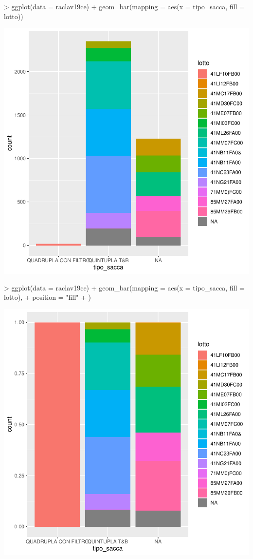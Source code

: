 \documentclass{article}
\begin{document}
\begin{Schunk}
\begin{Sinput}
> ggplot(data = raclav19ce) + geom_bar(mapping = aes(x = tipo_sacca, fill = lotto))
\end{Sinput}
\end{Schunk}
\includegraphics{tidigg-013}
\begin{Schunk}
\begin{Sinput}
> ggplot(data = raclav19ce) + geom_bar(mapping = aes(x = tipo_sacca, fill = lotto),
+ position = "fill"
+ )
\end{Sinput}
\end{Schunk}
\includegraphics{tidigg-014}
\end{document}
